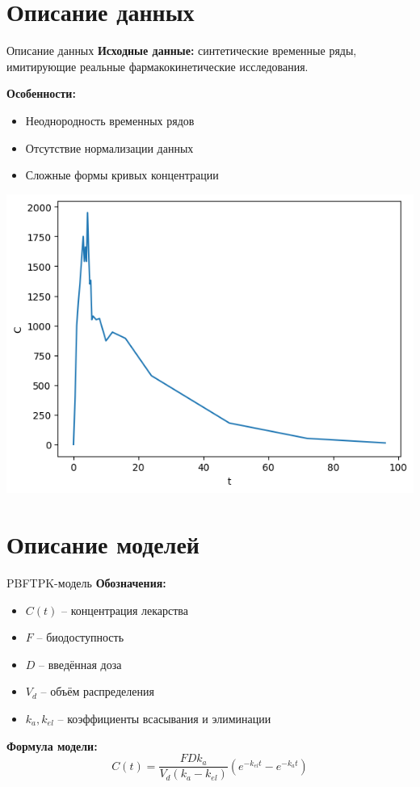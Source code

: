 \documentclass[12pt]{beamer}
\begin{document}
\section{Описание данных}
\begin{frame}{Описание данных}
	\textbf{Исходные данные:} синтетические временные ряды, имитирующие реальные фармакокинетические исследования.

	\textbf{Особенности:}
	\begin{itemize}
		\item Неоднородность временных рядов
		\item Отсутствие нормализации данных
		\item Сложные формы кривых концентрации
	\end{itemize}

	\begin{center}
		\includegraphics[width=0.45\linewidth]{sample.png}
	\end{center}
\end{frame}

\section{Описание моделей}
\begin{frame}{PBFTPK-модель}
	\textbf{Обозначения:}
	\begin{itemize}
		\item $C(t)$ – концентрация лекарства
		\item $F$ – биодоступность
		\item $D$ – введённая доза
		\item $V_d$ – объём распределения
		\item $k_a, k_{el}$ – коэффициенты всасывания и элиминации
	\end{itemize}

	\textbf{Формула модели:}
	\[ C(t) = \frac{FD k_a}{V_d (k_a - k_{el})} (e^{-k_{el}t} - e^{-k_a t}) \]
\end{frame}
\end{document}
